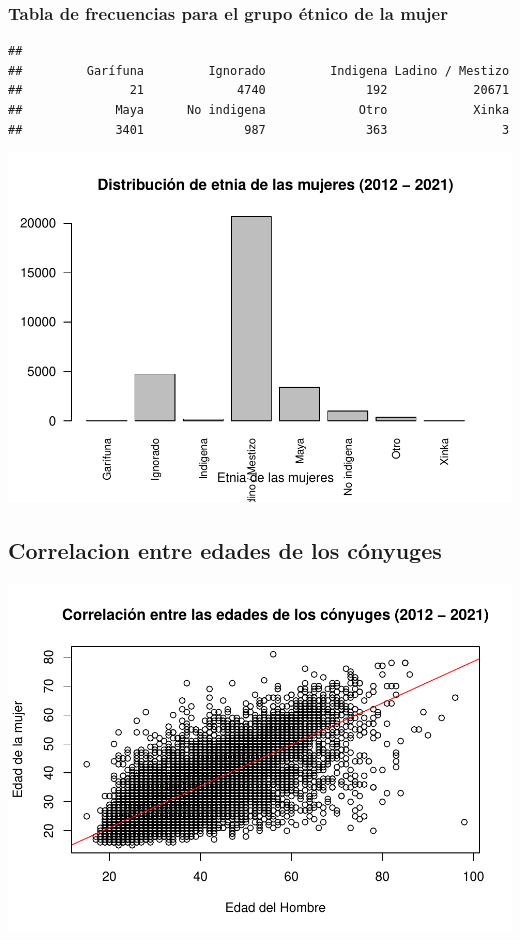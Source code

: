 \documentclass[
]{article}
\begin{document}
\hypertarget{tabla-de-frecuencias-para-el-grupo-uxe9tnico-de-la-mujer}{%
\subsubsection{Tabla de frecuencias para el grupo étnico de la
mujer}\label{tabla-de-frecuencias-para-el-grupo-uxe9tnico-de-la-mujer}}

\begin{verbatim}
## 
##         Garífuna         Ignorado         Indigena Ladino / Mestizo 
##               21             4740              192            20671 
##             Maya      No indigena             Otro            Xinka 
##             3401              987              363                3
\end{verbatim}

\includegraphics{Proyecto_files/figure-latex/frecuenciaEtniaMujer-1.pdf}

\hypertarget{correlacion-entre-edades-de-los-cuxf3nyuges}{%
\subsection{Correlacion entre edades de los
cónyuges}\label{correlacion-entre-edades-de-los-cuxf3nyuges}}

\includegraphics{Proyecto_files/figure-latex/CorrelacionEdades-1.pdf}
\end{document}
